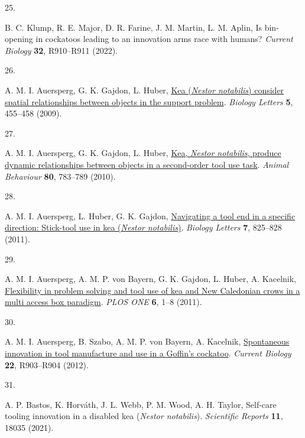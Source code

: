 \documentclass[
  man, donotrepeattitle,floatsintext]{apa6}
\newlength{\cslhangindent}
\newlength{\csllabelwidth}
\newlength{\cslentryspacingunit} %
\newenvironment{CSLReferences}[2] %
 {%
  \setlength{\parindent}{0pt}
  \ifodd #1
  \let\oldpar\par
  \def\par{\hangindent=\cslhangindent\oldpar}
  \fi
  \setlength{\parskip}{#2\cslentryspacingunit}
 }%
 {}
\newcommand{\CSLLeftMargin}[1]{\parbox[t]{\csllabelwidth}{#1}}
\newcommand{\CSLRightInline}[1]{\parbox[t]{\linewidth - \csllabelwidth}{#1}\break}
\begin{document}
\begin{CSLReferences}{0}{0}
\leavevmode{}%
\CSLLeftMargin{25. }%
\CSLRightInline{B. C. Klump, R. E. Major, D. R. Farine, J. M. Martin, L. M. Aplin, Is bin-opening in cockatoos leading to an innovation arms race with humans? \emph{Current Biology} \textbf{32}, R910--R911 (2022).}

\leavevmode{}%
\CSLLeftMargin{26. }%
\CSLRightInline{A. M. I. Auersperg, G. K. Gajdon, L. Huber, \href{https://doi.org/10.1098/rsbl.2009.0114}{Kea (\emph{{N}estor notabilis}) consider spatial relationships between objects in the support problem}. \emph{Biology Letters} \textbf{5}, 455--458 (2009).}

\leavevmode{}%
\CSLLeftMargin{27. }%
\CSLRightInline{A. M. I. Auersperg, G. K. Gajdon, L. Huber, \href{https://doi.org/10.1016/j.anbehav.2010.08.007}{Kea, \emph{{N}estor notabilis}, produce dynamic relationships between objects in a second-order tool use task}. \emph{Animal Behaviour} \textbf{80}, 783--789 (2010).}

\leavevmode{}%
\CSLLeftMargin{28. }%
\CSLRightInline{A. M. I. Auersperg, L. Huber, G. K. Gajdon, \href{https://doi.org/10.1098/rsbl.2011.0388}{Navigating a tool end in a specific direction: Stick-tool use in kea (\emph{{N}estor notabilis})}. \emph{Biology Letters} \textbf{7}, 825--828 (2011).}

\leavevmode{}%
\CSLLeftMargin{29. }%
\CSLRightInline{A. M. I. Auersperg, A. M. P. von Bayern, G. K. Gajdon, L. Huber, A. Kacelnik, \href{https://doi.org/10.1371/journal.pone.0020231}{Flexibility in problem solving and tool use of kea and {N}ew {C}aledonian crows in a multi access box paradigm}. \emph{PLOS ONE} \textbf{6}, 1--8 (2011).}

\leavevmode{}%
\CSLLeftMargin{30. }%
\CSLRightInline{A. M. I. Auersperg, B. Szabo, A. M. P. von Bayern, A. Kacelnik, \href{https://doi.org/10.1016/j.cub.2012.09.002}{Spontaneous innovation in tool manufacture and use in a {G}offin's cockatoo}. \emph{Current Biology} \textbf{22}, R903--R904 (2012).}

\leavevmode{}%
\CSLLeftMargin{31. }%
\CSLRightInline{A. P. Bastos, K. Horváth, J. L. Webb, P. M. Wood, A. H. Taylor, Self-care tooling innovation in a disabled kea (\emph{{N}estor notabilis}). \emph{Scientific Reports} \textbf{11}, 18035 (2021).}


\end{CSLReferences}
\end{document}

